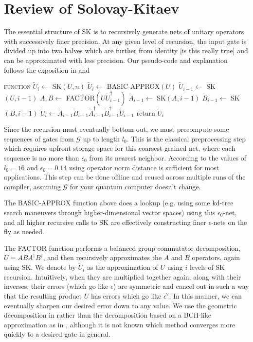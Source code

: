 \section{Review of Solovay-Kitaev}
\label{sec:sk-algo}

The essential structure of SK is to recursively generate nets of unitary
operators with
successively finer precision. At any given level of recursion, the input 
gate is divided up into two halves which are further from identity [is this
really true] and can be
approximated with less precision. Our pseudo-code and explanation
follows the exposition in \cite{Dawson2005} and \cite{harrow01}

\begin{algorithmic}[1]
\STATE \textsc{function} $\tilde{U}_i \leftarrow$ SK$(U,n)$
\STATE $\tilde{U}_i \leftarrow $ BASIC-APPROX$(U)$
\ELSE
\STATE $\tilde{U}_{i-1} \leftarrow$ SK$(U, i-1)$
\STATE $A,B \leftarrow $ FACTOR$(U\tilde{U}^\dagger_{i-1})$
\STATE $\tilde{A}_{i-1} \leftarrow $ SK$(A, i-1)$
\STATE $\tilde{B}_{i-1} \leftarrow $ SK$(B, i-1)$
\STATE $\tilde{U}_i \leftarrow \tilde{A}_{i-1}\tilde{B}_{i-1}\tilde{A}^\dagger_{i-1}\tilde{B}^\dagger_{i-1}\tilde{U}_{i-1}$
\ENDIF
\STATE return $\tilde{U}_i$
\end{algorithmic}

Since the recursion must eventually bottom out, we must precompute some sequences
of gates from $\mathcal{G}$ up to length $l_0$. This is the classical
preprocessing step which requires upfront storage space for this
coarsest-grained net, where
each sequence is no more than $\epsilon_0$ from its nearest neighbor. According
to \cite{Dawson2005} the values of $l_0=16$ and $\epsilon_0 = 0.14$ using
operator norm distance is sufficient for most applications.
This step can be
done offline and reused across multiple runs of the compiler, assuming
$\mathcal{G}$ for your quantum computer doesn't change.

The BASIC-APPROX function above does a lookup (e.g. using some kd-tree search
maneuvers through higher-dimensional vector spaces) using this $\epsilon_0$-net,
and all higher recursive calls to SK are effectively constructing
finer $\epsilon$-nets on the fly as needed.

The FACTOR function performs a balanced group commutator decomposition,
$U = ABA^\dagger B^\dagger$, and then recursively approximates the $A$ and $B$
operators, again using SK. We denote by $\tilde{U}_i$ as the approximation
of $U$ using $i$ levels of SK recursion. Intuitively, when they are multiplied
together again, along with their inverses, their errors (which go like
$\epsilon$) are symmetric and cancel out in such a way that the resulting
product $U$ has errors which go like $\epsilon^2$. In this manner, we can
eventually sharpen our desired error down to any value. We use the
geometric decomposition in \cite{Dawson2005} rather than the decomposition
based on a BCH-like approximation as in \cite{harrow01}, although it is not
known which method converges more quickly to a desired gate in general.

